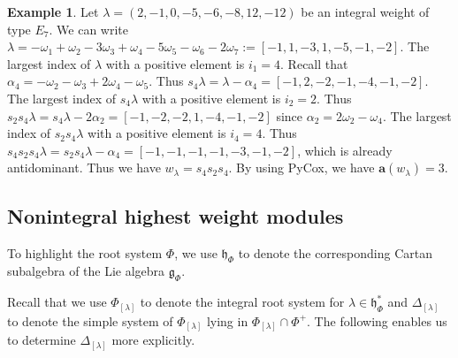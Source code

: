 \documentclass[reqno,12pt]{amsart}
\numberwithin{equation}{section}
\theoremstyle{plain}
\theoremstyle{definition}
\newtheorem{ex}[Thm]{Example}
\newcommand{\lam}{\lambda}
\newcommand{\ep}{\varepsilon}
\newcommand{\aff}{ \mathbf{a} }
\begin{document}


 









\begin{ex}
  Let  $\lam=(2,-1,0,-5,-6,-8,12,-12)$ be  an integral weight of type $E_7$. We can write $\lam=-\omega_1+\omega_2-3\omega_3+\omega_4-5\omega_5-\omega_6-2\omega_7:=[-1,1,-3,1,-5,-1,-2]$. The largest index of $\lam$ with a positive element is $i_1=4$. Recall that $\alpha_4=-\omega_{2}-\omega_{3}+2\omega_{4}-\omega_5$. Thus $s_{4}\lam=\lam-\alpha_4=[-1,2,-2,-1,-4,-1,-2]$. The largest index of $s_4\lam$ with a positive element is $i_2=2$. Thus $s_2s_{4}\lam=s_{4}\lam-2\alpha_2=[-1,-2,-2,1,-4,-1,-2]$ since $\alpha_2=2\omega_{2}-\omega_4$. The largest index of $s_2s_4\lam$ with a positive element is $i_4=4$. Thus $s_4s_2s_{4}\lam=s_2s_{4}\lam-\alpha_4=[-1,-1,-1,-1,-3,-1,-2]$, which is already antidominant. Thus we have $w_{\lam}=s_4s_2s_{4}$. By using PyCox, we have $\aff(w_{\lam})=3$.
\end{ex}

\subsection{Nonintegral highest weight modules}\label{nonint}
To highlight the root system $\Phi$, we use $\mathfrak{h}_{\Phi}$ to denote the corresponding Cartan subalgebra of the Lie algebra $\mathfrak{g}_\Phi$. 

Recall that we use $\Phi_{[\lam]}$ to denote the integral root system for $\lam\in \mathfrak{h}_{\Phi}^*$ and $\Delta_{[\lambda]}$ to denote the simple system of  $\Phi_{[\lambda]}$ lying in $\Phi_{[\lambda]} \cap \Phi^+$. 
The following enables us to determine  $\Delta_{[\lambda]}$ more explicitly.
\end{document}
